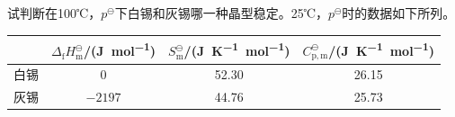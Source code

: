 \begin{frame}[t]
    \frametitle{}
    \begin{example}
        试判断在100℃，$p^\ominus$下白锡和灰锡哪一种晶型稳定。25℃，$p^\ominus$时的数据如下所列。
        \begin{table}
            \centering
            \begin{tabular}{cccc}
                \bottomrule
                 & $\Delta_\mathrm{f} H_\mathrm{m}^\ominus$/(\si{J.mol^{-1}}) & $S_\mathrm{m}^\ominus$/(\si{J.K^{-1}.mol^{-1}}) & $C_\mathrm{p,m}^\ominus$/(\si{J.K^{-1}.mol^{-1}}) \\ \hline
                白锡 & 0 & 52.30 & 26.15 \\ \hline
                灰锡 & $-2197$ & 44.76 & 25.73 \\ \toprule
            \end{tabular}
        \end{table}
    \end{example}
\end{frame}

